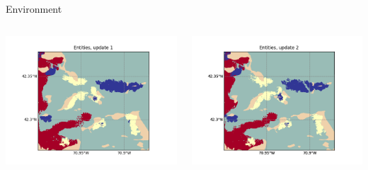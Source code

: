 \documentclass[9pt,xcolor=table]{beamer}
\begin{document}
\begin{frame}{Environment}
    \begin{columns}
        \begin{column}{0.5\textwidth}
            \includegraphics[width=\textwidth,trim={0cm 0cm 0cm 0cm},clip]{img/e1.png}
        \end{column}
        \begin{column}{0.5\textwidth}
            \includegraphics[width=\textwidth,trim={0cm 0cm 0cm 0cm},clip]{img/e2.png}
        \end{column}
    \end{columns}
    \begin{columns}
        \begin{column}{0.5\textwidth}

\end{column}
\end{columns}
\end{frame}
\end{document}
